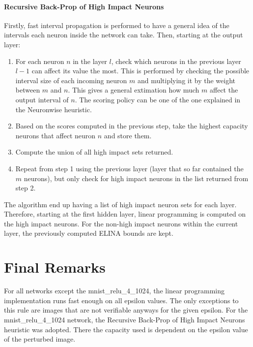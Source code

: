 \documentclass[11pt,a4paper]{article}
\begin{document}
\paragraph{Recursive Back-Prop of High Impact Neurons}
Firstly, fast interval propagation is performed to have a general idea of the intervals each neuron inside the network can take. Then, starting at the output layer:
\begin{enumerate}
  \item For each neuron $n$ in the layer $l$, check which neurons in the previous layer $l-1$ can affect its value the most. This is performed by checking the possible interval size of each incoming neuron $m$ and multiplying it by the weight between $m$ and $n$. This gives a general extimation how much $m$ affect the output interval of $n$. The scoring policy can be one of the one explained in the Neuronwise heuristic.
  \item Based on the scores computed in the previous step, take the highest capacity neurons that affect neuron $n$ and store them.
  \item Compute the union of all high impact sets returned.
  \item Repeat from step 1 using the previous layer (layer that so far contained the $m$ neurons), but only check for high impact neurons in the list returned from step 2.
\end{enumerate}
The algorithm end up having a list of high impact neuron sets for each layer. Therefore, starting at the first hidden layer, linear programming is computed on the high impact neurons. For the non-high impact neurons within the current layer, the previously computed ELINA bounds are kept.

\section{Final Remarks}
For all networks except the mnist\_relu\_4\_1024, the linear programming implementation runs fast enough on all epsilon values. The only exceptions to this rule are images that are not verifiable anyways for the given epsilon. For the mnist\_relu\_4\_1024 network, the Recursive Back-Prop of High Impact Neurons heuristic was adopted. There the capacity used is dependent on the epsilon value of the perturbed image.
\end{document}
